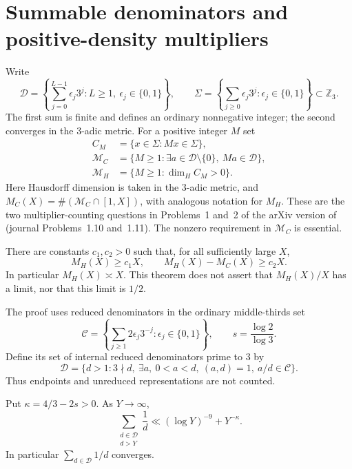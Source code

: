 \section{Summable denominators and positive-density multipliers}
\label{sec:positive-density}

Write
\[
 \mathcal D=\left\{\sum_{j=0}^{L-1}\epsilon_j3^j:
       L\geq1,\ \epsilon_j\in\{0,1\}\right\},\qquad
 \Sigma=\left\{\sum_{j\geq0}\epsilon_j3^j:
       \epsilon_j\in\{0,1\}\right\}\subset\mathbb Z_3.
\]
The first sum is finite and defines an ordinary nonnegative integer;
the second converges in the $3$-adic metric. For a positive integer $M$ set
\[
 \begin{aligned}
 C_M&=\{x\in\Sigma:Mx\in\Sigma\},\\
 \mathcal M_C&=\{M\geq1:\exists a\in\mathcal D\setminus\{0\},\ Ma\in\mathcal D\},\\
 \mathcal M_H&=\{M\geq1:\dim_H C_M>0\}.
 \end{aligned}
\]
Here Hausdorff dimension is taken in the $3$-adic metric, and
$M_C(X)=\#(\mathcal M_C\cap[1,X])$, with analogous notation for $M_H$.
These are the two multiplier-counting questions in Problems~1 and~2 of
the arXiv version of \cite{Lagarias} (journal Problems~1.10 and~1.11).
The nonzero requirement in $\mathcal M_C$ is essential.

\begin{theorem}\label{thm:pd-main}
There are constants $c_1,c_2>0$ such that, for all sufficiently large $X$,
\[
 M_H(X)\geq c_1X,\qquad M_H(X)-M_C(X)\geq c_2X.
\]
In particular $M_H(X)\asymp X$. This theorem does not assert that
$M_H(X)/X$ has a limit, nor that this limit is $1/2$.
\end{theorem}

The proof uses reduced denominators in the ordinary middle-thirds set
\[
 \mathcal C=\left\{\sum_{j\geq1}2\epsilon_j3^{-j}:\epsilon_j\in\{0,1\}\right\},
 \qquad s=\frac{\log2}{\log3}.
\]
Define its set of internal reduced denominators prime to $3$ by
\[
 \mathscr D=\{d>1:3\nmid d,\ \exists a,\ 0<a<d,\ (a,d)=1,
                                      \ a/d\in\mathcal C\}.
\]
Thus endpoints and unreduced representations are not counted.

\begin{theorem}\label{thm:pd-denominators}
Put $\kappa=4/3-2s>0$. As $Y\longrightarrow\infty$,
\[
 \sum_{\substack{d\in\mathscr D\\d>Y}}\frac1d
       \ll (\log Y)^{-9}+Y^{-\kappa}.
\]
In particular $\sum_{d\in\mathscr D}1/d$ converges.
\end{theorem}

